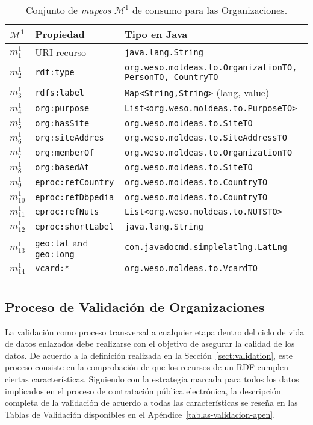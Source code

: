 \begin{longtable}[c]{|p{2cm}|p{4.5cm}|p{8cm}|} 
\hline
  \textbf{$\mathcal{M}^1$} &  \textbf{Propiedad} & \textbf{Tipo en Java} \\\hline
\endhead
 $m^1_1$ & URI recurso     		& \texttt{java.lang.String} \\ \hline
 $m^1_2$ & \texttt{rdf:type}      	& \texttt{org.weso.moldeas.to.{OrganizationTO, PersonTO, CountryTO}}\\ \hline
 $m^1_3$ & \texttt{rdfs:label} 		& \texttt{Map<String,String>} (lang, value) \\ \hline
 $m^1_4$ & \texttt{org:purpose} 	& \texttt{List<org.weso.moldeas.to.PurposeTO>} \\ \hline
 $m^1_5$ & \texttt{org:hasSite}    	& \texttt{org.weso.moldeas.to.SiteTO} \\ \hline
 $m^1_6$ & \texttt{org:siteAddres} 	& \texttt{org.weso.moldeas.to.SiteAddressTO}  \\ \hline
 $m^1_7$ & \texttt{org:memberOf} 	& \texttt{org.weso.moldeas.to.OrganizationTO}\\ \hline
 $m^1_8$ & \texttt{org:basedAt} 	& \texttt{org.weso.moldeas.to.SiteTO} \\ \hline
 $m^1_9$ & \texttt{eproc:refCountry} 	& \texttt{org.weso.moldeas.to.CountryTO} \\ \hline  
 $m^1_{10}$ & \texttt{eproc:refDbpedia} & \texttt{org.weso.moldeas.to.CountryTO}   \\ \hline
 $m^1_{11}$ & \texttt{eproc:refNuts}    & \texttt{List<org.weso.moldeas.to.NUTSTO>} \\ \hline   
 $m^1_{12}$ & \texttt{eproc:shortLabel} & \texttt{java.lang.String}\\ \hline   
 $m^1_{13}$ & \texttt{geo:lat} and  \texttt{geo:long} & \texttt{com.javadocmd.simplelatlng.LatLng} \\ \hline   
 $m^1_{14}$ & \texttt{vcard:*} 		& \texttt{org.weso.moldeas.to.VcardTO} \\ \hline   
\hline
\caption{Conjunto de \textit{mapeos} $\mathcal{M}^1$ de consumo para las Organizaciones.}\label{table:orgs-consumo}\\    
\end{longtable}

\subsection{Proceso de Validación de Organizaciones}
La validación como proceso transversal a cualquier etapa dentro del ciclo de vida de datos 
enlazados debe realizarse con el objetivo de asegurar la calidad de los datos. De acuerdo a la 
definición realizada en la Sección~\ref{sect:validation}, este proceso consiste en la comprobación 
de que los recursos de un \dataset RDF cumplen ciertas características. Siguiendo con la estrategia marcada para 
todos los datos implicados en el proceso de contratación pública electrónica, la descripción completa de la validación de acuerdo 
a todas las características se reseña en las Tablas de Validación disponibles en el Apéndice~\ref{tablas-validacion-apen}.

